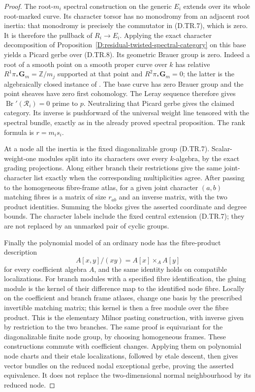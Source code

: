 \begin{proof}
The root-$m_i$ spectral construction on the generic
$E_i$ extends over its whole root-marked curve. Its
character torsor has no monodromy from an adjacent
root inertia: that monodromy is precisely the
commutator in (D.TR.7), which is zero. It is therefore
the pullback of $R_i\to E_i$. Applying the exact
character decomposition of
Proposition~\ref{D:residual-twisted-spectral-category}
on this base yields a Picard gerbe over (D.TR.8).
Its geometric Brauer group is zero. Indeed a root
of a smooth point on a smooth proper curve over $k$
has relative $R^1\pi_*\mathbf G_m=\mathbb Z/m_j$
supported at that point and $R^2\pi_*\mathbf G_m=0$;
the latter is the algebraically closed instance of
\citet[Lemmas4.1.1--4.1.3 and Proposition4.1.4]
{Lieblich2011ResidualD}. The base curve has zero
Brauer group and the point sheaves have zero first
cohomology. The Leray sequence therefore gives
$\operatorname{Br}'(\mathcal R_i)=0$ prime to $p$.
Neutralizing that Picard gerbe gives the claimed
category. Its inverse is pushforward of the universal
weight line tensored with the spectral bundle, exactly
as in the already proved spectral proposition.
The rank formula is $r=m_i s_i$.

At a node all the inertia is the fixed diagonalizable
group (D.TR.7). Scalar-weight-one modules split into
its characters over every $k$-algebra, by the exact
grading projections. Along either branch their
restrictions give the same joint-character list
exactly when the corresponding multiplicities agree.
After passing to the homogeneous fibre-frame atlas,
for a given joint character $(a,b)$ matching fibres
is a matrix of size $r_{ab}$ and an inverse matrix,
with the two product identities. Summing the blocks
gives the asserted coordinate and degree bounds.
The character labels include the fixed central
extension (D.TR.7); they are not replaced by an
unmarked pair of cyclic groups.

Finally the polynomial model of an ordinary node has
the fibre-product description
\[
       A[x,y]/(xy)=A[x]\times_A A[y]                 \tag{D.TR.9}
\]
for every coefficient algebra $A$, and the same identity
holds on compatible localizations. For branch modules
with a specified fibre identification, the gluing module
is the kernel of their difference map to the identified
node fibre. Locally on the coefficient and branch frame
atlases, change one basis by the prescribed invertible
matching matrix; this kernel is then a free module over
the fibre product. This is the elementary Milnor pasting
construction, with inverse given by restriction to the
two branches. The same proof is equivariant for the
diagonalizable finite node group, by choosing homogeneous
frames. These constructions commute with coefficient
changes. Applying them on polynomial node charts and
their etale localizations, followed by etale descent,
then gives vector bundles on the reduced nodal
exceptional gerbe, proving the asserted equivalence.
It does not replace the two-dimensional normal
neighbourhood by its reduced node.
\end{proof}

